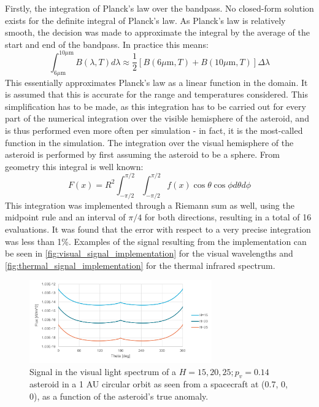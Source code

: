 Firstly, the integration of Planck's law over the bandpass. No closed-form solution exists for the definite integral of Planck's law. As Planck's law is relatively smooth, the decision was made to approximate the integral by the average of the start and end of the bandpass. In practice this means:
\begin{equation}
 \int _{6 \mu\mathrm{m}}^{10 \mu\mathrm{m}} B(\lambda, T) d\lambda \approx \frac{1}{2}\left[B(6 \mu\mathrm{m}, T) + B(10 \mu\mathrm{m}, T)\right] \Delta \lambda
\end{equation}
This essentially approximates Planck's law as a linear function in the domain. It is assumed that this is accurate for the range and temperatures considered. This simplification has to be made, as this integration has to be carried out for every part of the numerical integration over the visible hemisphere of the asteroid, and is thus performed even more often per simulation - in fact, it is the most-called function in the simulation. The integration over the visual hemisphere of the asteroid is performed by first assuming the asteroid to be a sphere. From geometry this integral is well known:
\begin{equation}
 F(x) = R^2\int_{-\pi/2}^{\pi/2}\int_{-\pi/2}^{\pi/2} f(x) \cos \theta \cos \phi d \theta d \phi
\end{equation}
This integration was implemented through a Riemann sum as well, using the midpoint rule and an interval of $\pi/4$ for both directions, resulting in a total of 16 evaluations. It was found that the error with respect to a very precise integration was less than 1\%. Examples of the signal resulting from the implementation can be seen in \autoref{fig:visual_signal_implementation} for the visual wavelengths and \autoref{fig:thermal_signal_implementation} for the thermal infrared spectrum.

\begin{figure}[htbp]
 \centering
 \includegraphics[width=0.7\textwidth]{img/implementation_vis_signal.pdf}
 \caption{Signal in the visual light spectrum of a $H=15, 20, 25; p_v=0.14$ asteroid in a 1 AU circular orbit as seen from a spacecraft at (0.7, 0, 0), as a function of the asteroid's true anomaly.}
 \label{fig:visual_signal_implementation}
\end{figure}



